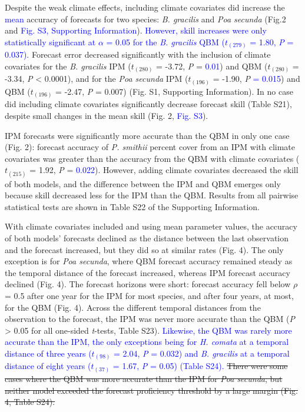 \documentclass[12pt,]{article}
\begin{document}
Despite the weak climate effects, including climate covariates did
increase the \textcolor{blue}{mean} accuracy of forecasts for two
species: \emph{B. gracilis} and \emph{Poa secunda} (Fig.2 and
\textcolor{blue}{Fig. S3, Supporting Information}).
\textcolor{blue}{However, skill increases were only statistically significant at $\alpha$ = 0.05 for the \emph{B. gracilis} QBM ($t_{(279)}$ = 1.80, \emph{P} = 0.037).}
Forecast error decreased significantly with the inclusion of climate
covariates for the \emph{B. gracilis} IPM (\(t_{(280)}\) = -3.72,
\emph{P} = \textcolor{blue}{0.01}) and QBM (\(t_{(280)}\) = -3.34,
\emph{P} \textless{} 0.0001), and for the \emph{Poa secunda} IPM
(\(t_{(196)}\) = -1.90, \emph{P} \textcolor{blue}{= 0.015}) and QBM
(\(t_{(196)}\) = -2.47, \emph{P} = 0.007) (Fig. S1, Supporting
Information). In no case did including climate covariates significantly
decrease forecast skill (Table S21), despite small changes in the mean
skill (Fig. 2, \textcolor{blue}{Fig. S3}).

IPM forecasts were significantly more accurate than the QBM in only one
case (Fig. 2): forecast accuracy of \emph{P. smithii} percent cover from
an IPM with climate covariates was greater than the accuracy from the
QBM with climate covariates (\(t_{(215)}\) = 1.92, \emph{P} =
\textcolor{blue}{0.022}). However, adding climate covariates decreased
the skill of both models, and the difference between the IPM and QBM
emerges only because skill decreased less for the IPM than the QBM.
Results from all pairwise statistical tests are shown in Table S22 of
the Supporting Information.

With climate covariates included and using mean parameter values, the
accuracy of both models' forecasts declined as the distance between the
last observation and the forecast increased, but they did so at similar
rates (Fig. 4). The only exception is for \emph{Poa secunda}, where QBM
forecast accuracy remained steady as the temporal distance of the
forecast increased, whereas IPM forecast accuracy declined (Fig. 4). The
forecast horizons were short: forecast accuracy fell below \(\rho\) =
0.5 after one year for the IPM for most species, and after four years,
at most, for the QBM (Fig. 4). Across the different temporal distances
from the observation to the forecast, the IPM was never more accurate
than the QBM (\emph{P} \textgreater{} 0.05 for all one-sided
\emph{t}-tests, Table S23).
\textcolor{blue}{Likewise, the QBM was rarely more accurate than the IPM, the only exceptions being for \emph{H. comata} at a temporal distance of three years ($t_{(98)}$ = 2.04, \emph{P} = 0.032) and \emph{B. gracilis} at a temporal distance of eight years ($t_{(37)}$ = 1.67, \emph{P} = 0.05) (Table S24).}
\st{There were some cases where the QBM was more accurate than the IPM for \emph{Poa secunda}, but neither model exceeded the forecast proficiency threshold by a large margin (Fig. 4, Table S24).}
\end{document}
